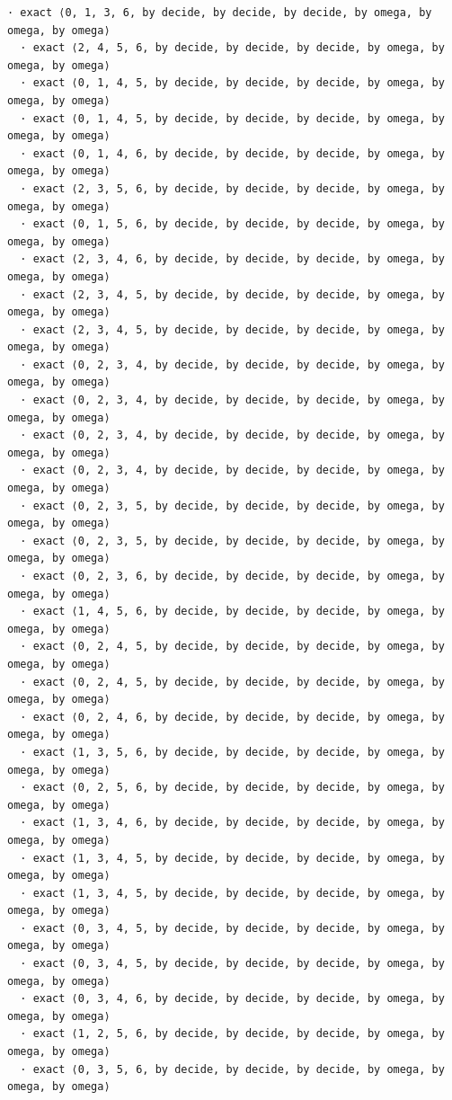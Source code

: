 \documentclass[11pt,a4paper]{article}
\begin{document}
\begin{Verbatim}[breaklines,breakanywhere,fontsize=\footnotesize]
  · exact ⟨0, 1, 3, 6, by decide, by decide, by decide, by omega, by omega, by omega⟩
  · exact ⟨2, 4, 5, 6, by decide, by decide, by decide, by omega, by omega, by omega⟩
  · exact ⟨0, 1, 4, 5, by decide, by decide, by decide, by omega, by omega, by omega⟩
  · exact ⟨0, 1, 4, 5, by decide, by decide, by decide, by omega, by omega, by omega⟩
  · exact ⟨0, 1, 4, 6, by decide, by decide, by decide, by omega, by omega, by omega⟩
  · exact ⟨2, 3, 5, 6, by decide, by decide, by decide, by omega, by omega, by omega⟩
  · exact ⟨0, 1, 5, 6, by decide, by decide, by decide, by omega, by omega, by omega⟩
  · exact ⟨2, 3, 4, 6, by decide, by decide, by decide, by omega, by omega, by omega⟩
  · exact ⟨2, 3, 4, 5, by decide, by decide, by decide, by omega, by omega, by omega⟩
  · exact ⟨2, 3, 4, 5, by decide, by decide, by decide, by omega, by omega, by omega⟩
  · exact ⟨0, 2, 3, 4, by decide, by decide, by decide, by omega, by omega, by omega⟩
  · exact ⟨0, 2, 3, 4, by decide, by decide, by decide, by omega, by omega, by omega⟩
  · exact ⟨0, 2, 3, 4, by decide, by decide, by decide, by omega, by omega, by omega⟩
  · exact ⟨0, 2, 3, 4, by decide, by decide, by decide, by omega, by omega, by omega⟩
  · exact ⟨0, 2, 3, 5, by decide, by decide, by decide, by omega, by omega, by omega⟩
  · exact ⟨0, 2, 3, 5, by decide, by decide, by decide, by omega, by omega, by omega⟩
  · exact ⟨0, 2, 3, 6, by decide, by decide, by decide, by omega, by omega, by omega⟩
  · exact ⟨1, 4, 5, 6, by decide, by decide, by decide, by omega, by omega, by omega⟩
  · exact ⟨0, 2, 4, 5, by decide, by decide, by decide, by omega, by omega, by omega⟩
  · exact ⟨0, 2, 4, 5, by decide, by decide, by decide, by omega, by omega, by omega⟩
  · exact ⟨0, 2, 4, 6, by decide, by decide, by decide, by omega, by omega, by omega⟩
  · exact ⟨1, 3, 5, 6, by decide, by decide, by decide, by omega, by omega, by omega⟩
  · exact ⟨0, 2, 5, 6, by decide, by decide, by decide, by omega, by omega, by omega⟩
  · exact ⟨1, 3, 4, 6, by decide, by decide, by decide, by omega, by omega, by omega⟩
  · exact ⟨1, 3, 4, 5, by decide, by decide, by decide, by omega, by omega, by omega⟩
  · exact ⟨1, 3, 4, 5, by decide, by decide, by decide, by omega, by omega, by omega⟩
  · exact ⟨0, 3, 4, 5, by decide, by decide, by decide, by omega, by omega, by omega⟩
  · exact ⟨0, 3, 4, 5, by decide, by decide, by decide, by omega, by omega, by omega⟩
  · exact ⟨0, 3, 4, 6, by decide, by decide, by decide, by omega, by omega, by omega⟩
  · exact ⟨1, 2, 5, 6, by decide, by decide, by decide, by omega, by omega, by omega⟩
  · exact ⟨0, 3, 5, 6, by decide, by decide, by decide, by omega, by omega, by omega⟩

\end{Verbatim}
\end{document}
